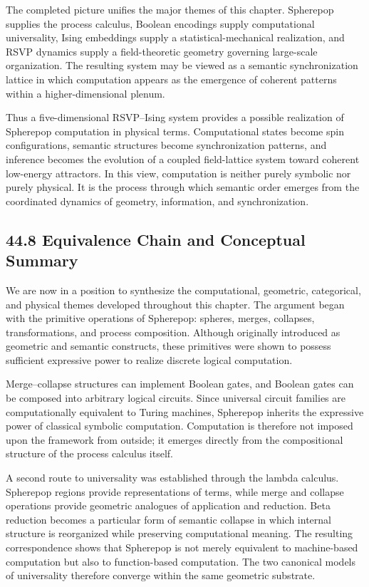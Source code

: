 \documentclass[12pt,letterpaper]{article}
\theoremstyle{remark}
\begin{document}
The completed picture unifies the major themes of this chapter. Spherepop supplies the process calculus, Boolean encodings supply computational universality, Ising embeddings supply a statistical-mechanical realization, and RSVP dynamics supply a field-theoretic geometry governing large-scale organization. The resulting system may be viewed as a semantic synchronization lattice in which computation appears as the emergence of coherent patterns within a higher-dimensional plenum.

Thus a five-dimensional RSVP--Ising system provides a possible realization of Spherepop computation in physical terms. Computational states become spin configurations, semantic structures become synchronization patterns, and inference becomes the evolution of a coupled field-lattice system toward coherent low-energy attractors. In this view, computation is neither purely symbolic nor purely physical. It is the process through which semantic order emerges from the coordinated dynamics of geometry, information, and synchronization.

\subsection{44.8 Equivalence Chain and Conceptual Summary}

We are now in a position to synthesize the computational, geometric, categorical, and physical themes developed throughout this chapter. The argument began with the primitive operations of Spherepop: spheres, merges, collapses, transformations, and process composition. Although originally introduced as geometric and semantic constructs, these primitives were shown to possess sufficient expressive power to realize discrete logical computation.

Merge--collapse structures can implement Boolean gates, and Boolean gates can be composed into arbitrary logical circuits. Since universal circuit families are computationally equivalent to Turing machines, Spherepop inherits the expressive power of classical symbolic computation. Computation is therefore not imposed upon the framework from outside; it emerges directly from the compositional structure of the process calculus itself.

A second route to universality was established through the lambda calculus. Spherepop regions provide representations of terms, while merge and collapse operations provide geometric analogues of application and reduction. Beta reduction becomes a particular form of semantic collapse in which internal structure is reorganized while preserving computational meaning. The resulting correspondence shows that Spherepop is not merely equivalent to machine-based computation but also to function-based computation. The two canonical models of universality therefore converge within the same geometric substrate.
\end{document}
